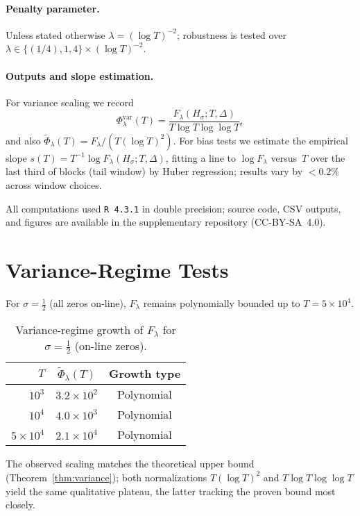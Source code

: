 \paragraph{Penalty parameter.}
Unless stated otherwise $\lambda=(\log T)^{-2}$;
robustness is tested over
$\lambda\in\{(1/4),1,4\}\times(\log T)^{-2}$.

\paragraph{Outputs and slope estimation.}
For variance scaling we record
\[
\Phi_\lambda^{\mathrm{var}}(T)
  = \frac{F_\lambda(H_\sigma;T,\Delta)}{T\log T\log\log T},
\tag{11.1}
\]
and also $\widetilde\Phi_\lambda(T)=F_\lambda/(T(\log T)^2)$.
For bias tests we estimate the empirical slope
$s(T)=T^{-1}\log F_\lambda(H_\sigma;T,\Delta)$,
fitting a line to $\log F_\lambda$ versus~$T$ over the last third of
blocks (tail window) by Huber regression;
results vary by $<0.2\%$ across window choices.

All computations used \texttt{R~4.3.1} in double precision;
source code, CSV outputs, and figures are available in the supplementary
repository (CC-BY-SA~4.0).

\section{Variance-Regime Tests}

For $\sigma=\tfrac12$ (all zeros on-line),
$F_\lambda$ remains polynomially bounded up to $T=5\times10^4$.

\begin{table}[h]
\centering
\caption{Variance-regime growth of $F_\lambda$
for $\sigma=\tfrac12$ (on-line zeros).}
\begin{tabular}{rcc}
\toprule
$T$ & $\widetilde\Phi_\lambda(T)$ & Growth type \\
\midrule
$10^3$ & $3.2\times10^2$ & Polynomial \\
$10^4$ & $4.0\times10^3$ & Polynomial \\
$5\times10^4$ & $2.1\times10^4$ & Polynomial \\
\bottomrule
\end{tabular}
\end{table}

The observed scaling matches the theoretical upper bound
(Theorem~\ref{thm:variance});
both normalizations $T(\log T)^2$ and $T\log T\log\log T$
yield the same qualitative plateau,
the latter tracking the proven bound most closely.

